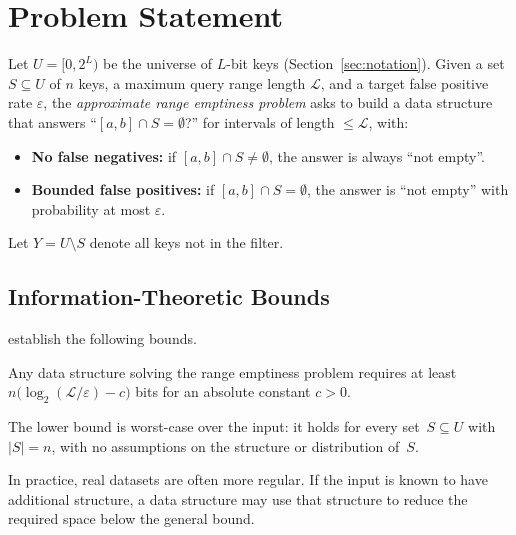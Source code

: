 \section{Problem Statement}
\label{sec:problem}

Let $U = [0, 2^L)$ be the universe of $L$-bit keys (Section~\ref{sec:notation}).
Given a set $S \subseteq U$ of $n$ keys, a maximum query range length $\mathcal{L}$,
and a target false positive rate $\varepsilon$, the \emph{approximate range emptiness problem} asks
to build a data structure that answers ``$[a, b] \cap S = \emptyset$?'' for intervals of
length $\leq \mathcal{L}$, with:

\begin{itemize}
    \item \textbf{No false negatives:} if $[a, b] \cap S \neq \emptyset$, the answer is always
    ``not empty''.
    \item \textbf{Bounded false positives:} if $[a, b] \cap S = \emptyset$, the answer is
    ``not empty'' with probability at most $\varepsilon$.
\end{itemize}

Let $Y = U \setminus S$ denote all keys not in the filter.

\subsection{Information-Theoretic Bounds}
\label{sec:bounds}

\citet{goswami2015approximate} establish the following bounds.

\begin{theorem}
Any data structure solving the range emptiness problem requires at least
$n \bigl(\log_2(\mathcal{L} / \varepsilon) - c\bigr)$ bits
for an absolute constant $c > 0$.
\end{theorem}

\begin{remark}
    The lower bound is worst-case over the input: it holds for every
    set~$S \subseteq U$ with $|S| = n$, with no assumptions on the
    structure or distribution of~$S$.
\end{remark}

\begin{remark}
    In practice, real datasets are often more regular.
    If the input is known to have additional structure, a data structure may use that
    structure to reduce the required space below the general bound.
\end{remark}

